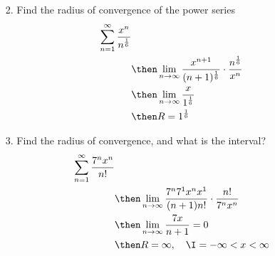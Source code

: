 \begin{itemize}
  \item[2.] Find the radius of convergence of the power series
    \begin{align*}
      \sum_{n= 1}^{\infty} \frac{x^n}{n^{\frac{1}{6}}} \\
      &\then \lim_{n \to \infty} \frac{x^{n+1}}{(n+1)^{\frac{1}{6}}} \cdot \frac{n^{\frac{1}{6}}}{x^n}\\
      &\then \lim_{n \to \infty} \frac{x}{1^{\frac{1}{6}}} \\
      &\then R = 1^{\frac{1}{6}}
    \end{align*}

  \item[3.] Find the radius of convergence, and what is the interval?
    \begin{align*}
      \sum_{n=1}^{\infty} \frac{7^n x^n }{n!} \\
      &\then \lim_{n \to \infty}\frac{7^n 7^1 x^n x^1}{(n+1)n!} \cdot \frac{n!}{7^n x^n } \\
      &\then \lim_{n \to \infty} \frac{7x}{n+1} = 0\\
      &\then R = \infty,\quad \I = -\infty < x < \infty
    \end{align*}

\end{itemize}

